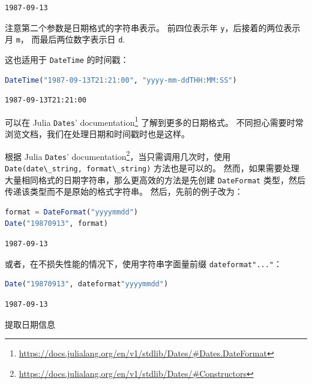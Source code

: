 \documentclass[
  notoc %
]{tufte-book}
\makeatletter
\DeclareRobustCommand{\href}[2]{#2\footnote{\url{#1}}}
\newcommand{\passthrough}[1]{#1}
\renewcommand\subsubsection{%
\@startsection{subsubsection}{3}{\z@ }{-3.25ex\@plus -1ex \@minus -.2ex}{1.5ex \@plus .2ex}{\normalfont \normalsize \bfseries }
}
\makeatother
\begin{document}
\begin{lstlisting}[language=Output]
1987-09-13
\end{lstlisting}

注意第二个参数是日期格式的字符串表示。 前四位表示年
\passthrough{\lstinline!y!}，后接着的两位表示月
\passthrough{\lstinline!m!}， 而最后两位数字表示日
\passthrough{\lstinline!d!}.

这也适用于 \passthrough{\lstinline!DateTime!} 的时间戳：

\begin{lstlisting}[language=Julia]
DateTime("1987-09-13T21:21:00", "yyyy-mm-ddTHH:MM:SS")
\end{lstlisting}

\begin{lstlisting}[language=Output]
1987-09-13T21:21:00
\end{lstlisting}

可以在
\href{https://docs.julialang.org/en/v1/stdlib/Dates/\#Dates.DateFormat}{Julia
\passthrough{\lstinline!Dates!}' documentation} 了解到更多的日期格式。
不同担心需要时常浏览文档，我们在处理日期和时间戳时也是这样。

根据
\href{https://docs.julialang.org/en/v1/stdlib/Dates/\#Constructors}{Julia
\passthrough{\lstinline!Dates!}' documentation}，当只需调用几次时，使用
\passthrough{\lstinline!Date(date\_string, format\_string)!}
方法也是可以的。
然而，如果需要处理大量相同格式的日期字符串，那么更高效的方法是先创建
\passthrough{\lstinline!DateFormat!}
类型，然后传递该类型而不是原始的格式字符串。 然后，先前的例子改为：

\begin{lstlisting}[language=Julia]
format = DateFormat("yyyymmdd")
Date("19870913", format)
\end{lstlisting}

\begin{lstlisting}[language=Output]
1987-09-13
\end{lstlisting}

或者，在不损失性能的情况下，使用字符串字面量前缀
\passthrough{\lstinline!dateformat"..."!}：

\begin{lstlisting}[language=Julia]
Date("19870913", dateformat"yyyymmdd")
\end{lstlisting}

\begin{lstlisting}[language=Output]
1987-09-13
\end{lstlisting}

\hypertarget{sec:dates_information}{%
\subsubsection{提取日期信息}\label{sec:dates_information}}
\end{document}
